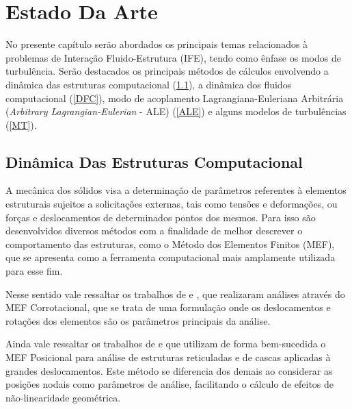 \documentclass[_ArquivoPrincipal.tex]{subfiles}
\begin{document}
    


\chapter{Estado Da Arte}
	
No presente capítulo serão abordados os principais temas relacionados à problemas de Interação Fluido-Estrutura (IFE), tendo como ênfase os modos de turbulência. Serão destacados os principais métodos de cálculos envolvendo a dinâmica das estruturas computacional (\ref{DEC}), a dinâmica dos fluidos computacional (\ref{DFC}), modo de acoplamento Lagrangiana-Euleriana Arbitrária (\textit{Arbitrary Lagrangian-Eulerian} - ALE) (\ref{ALE}) e alguns modelos de turbulências (\ref{MT}).

\section{Dinâmica Das Estruturas Computacional} \label{DEC}

A mecânica dos sólidos visa a determinação de parâmetros referentes à elementos estruturais sujeitos a solicitações externas, tais como tensões e deformações, ou forças e deslocamentos de determinados pontos dos mesmos. Para isso são desenvolvidos diversos métodos com a finalidade de melhor descrever o comportamento das estruturas, como o Método dos Elementos Finitos (MEF), que se apresenta como a ferramenta computacional mais amplamente utilizada para esse fim.

Nesse sentido vale ressaltar os trabalhos de  e , que realizaram análises através do MEF Corrotacional, que se trata de uma formulação onde os deslocamentos e rotações dos elementos são os parâmetros principais da análise.

Ainda vale ressaltar os trabalhos de  e  que utilizam de forma bem-sucedida o MEF Posicional para análise de estruturas reticuladas e de cascas aplicadas à grandes deslocamentos. Este método se diferencia dos demais ao considerar as posições nodais como parâmetros de análise, facilitando o cálculo de efeitos de não-linearidade geométrica.
\end{document}
